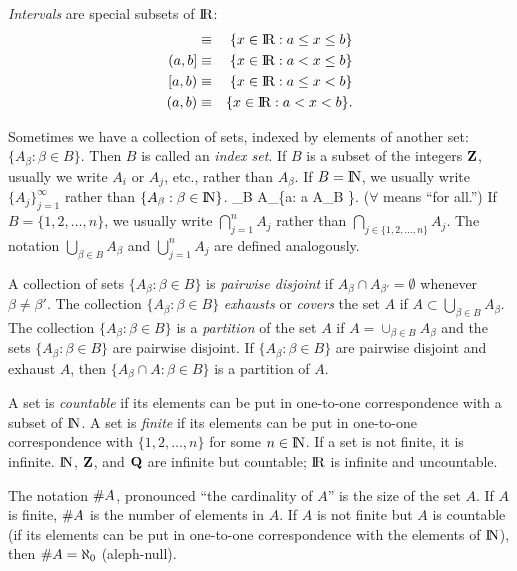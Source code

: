 {\em Intervals\/} are special subsets of $\hbox{I\kern-.17em\hbox{R}}$:
\begin{eqnarray*}
        [a, b] &\equiv& \{x \in \bfR : a \le x \le b\}\cr
        (a, b] &\equiv& \{x \in \bfR : a < x \le b\}\cr
        [a, b) &\equiv& \{x \in \bfR : a \le x < b\}\cr
        (a, b) &\equiv& \{x \in \bfR : a < x < b\}.
\end{eqnarray*}

Sometimes we have a collection of sets, indexed by elements of another
set: $\{A_\beta : \beta \in B \}$.
Then $B$ is called an {\em index set\/}.
If $B$ is a subset of the integers ${\bf Z}$, usually we write $A_i$ or $A_j$, etc.,
rather than $A_\beta$.
If $B = \hbox{I\kern-.17em\hbox{N}}$, we usually write $\{A_j\}_{j=1}^\infty$ rather than
$\{A_\beta : \beta \in \hbox{I\kern-.17em\hbox{N}} \}$.
\beq
        \bigcap_{\beta \in B} A_\beta \equiv \{a: a \in A_\beta \;\;\forall \beta \in B \}.
\eeq
($\forall$ means ``for all.'')
If $B = \{1, 2, \ldots, n\}$, we usually write $\bigcap_{j=1}^n A_j$ rather than
$\bigcap_{j \in \{1, 2, \ldots, n\}} A_j$.
The notation $\bigcup_{\beta \in B} A_\beta$ and $\bigcup_{j=1}^n A_j$ are defined analogously.

A collection of sets $\{A_\beta : \beta \in B \}$ is {\em pairwise disjoint\/}
if $A_\beta \cap A_{\beta'} = \emptyset$ whenever $\beta \ne \beta'$.
The collection $\{A_\beta : \beta \in B\}$ {\em exhausts\/} or {\em covers\/}
the set $A$ if $A \subset \bigcup_{\beta \in B} A_\beta$.
The collection $\{A_\beta : \beta \in B \}$ is a {\em partition\/} of the
set $A$ if $A = \cup_{\beta \in B} A_\beta$ and the sets $\{A_\beta : \beta \in B \}$
are pairwise disjoint.
If $\{A_\beta : \beta \in B \}$ are pairwise disjoint and exhaust $A$, then
$\{A_\beta \cap A : \beta \in B \}$ is a partition of $A$.

A set is {\em countable} if its elements can be put in one-to-one correspondence with
a subset of $\hbox{I\kern-.17em\hbox{N}}$.
A set is {\em finite} if its elements can be put in one-to-one correspondence with
$\{1, 2, \ldots, n\}$ for some $n \in \hbox{I\kern-.17em\hbox{N}}$.
If a set is not finite, it is infinite.
$\hbox{I\kern-.17em\hbox{N}}$, ${\bf Z}$, and ${\bf Q}$ are infinite but countable; $\hbox{I\kern-.17em\hbox{R}}$ is infinite and uncountable.

The notation $\mbox{\#} A$, pronounced ``the cardinality of $A$'' is the size of the set $A$.
If $A$ is finite, $\mbox{\#} A$ is the number of elements in $A$.
If $A$ is not finite but $A$ is countable (if its elements can be put in one-to-one
correspondence with the elements of $\hbox{I\kern-.17em\hbox{N}}$), then $\mbox{\#} A = \aleph_0$ (aleph-null).

